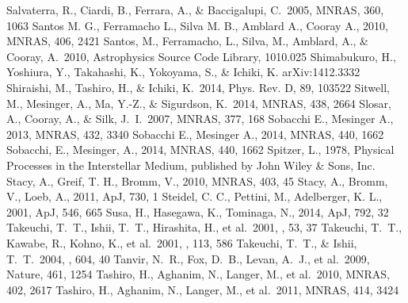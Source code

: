 \begin{thebibliography}{99}
\begin{multicols}{2}
{ Salvaterra, R., Ciardi, B., Ferrara, A., \& Baccigalupi, C.\ 2005, MNRAS, 360, 1063 
 Santos M. G., Ferramacho L., Silva M. B., Amblard A., Cooray A., 2010, MNRAS, 406, 2421
 Santos, M., Ferramacho, L., Silva, M., Amblard, A., \& Cooray, A.\ 2010, Astrophysics Source Code Library, 1010.025 
 Shimabukuro, H., Yoshiura, Y., Takahashi, K., Yokoyama, S., \& Ichiki, K. arXiv:1412.3332
 Shiraishi, M., Tashiro, H., \& Ichiki, K.\ 2014, Phys. Rev. D, 89, 103522 
 Sitwell, M., Mesinger, A., Ma, Y.-Z., \& Sigurdson, K.\ 2014, MNRAS, 438, 2664 
 Slosar, A., Cooray, A., \& Silk, J.~I.\ 2007, MNRAS, 377, 168 
 Sobacchi E., Mesinger A., 2013, MNRAS, 432, 3340
 Sobacchi E., Mesinger A., 2014, MNRAS, 440, 1662
 Sobacchi, E., Mesinger, A., 2014, MNRAS, 440, 1662
 Spitzer, L., 1978, Physical Processes in the Interstellar Medium, published by John Wiley \& Sons, Inc.  
 Stacy, A., Greif, T. H., Bromm, V., 2010, MNRAS, 403, 45
 Stacy, A., Bromm, V., Loeb, A., 2011, ApJ, 730, 1 
 Steidel, C. C., Pettini, M., Adelberger, K. L., 2001, ApJ, 546, 665
 Susa, H., Hasegawa, K., Tominaga, N., 2014, ApJ, 792, 32 
 Takeuchi, T.~T., 
Ishii, T.~T., Hirashita, H., et al.\ 2001, \pasj, 53, 37 
 Takeuchi, T.~T., 
Kawabe, R., Kohno, K., et al.\ 2001, \pasp, 113, 586 
 Takeuchi, T.~T., \& Ishii, T.~T.\ 2004, \apj, 604, 40 
 Tanvir, N.~R., Fox, D.~B., Levan, A.~J., et al.\ 2009, Nature, 461, 1254 
 Tashiro, H., Aghanim, N., Langer, M., et al.\ 2010, MNRAS, 402, 2617 
 Tashiro, H., Aghanim, N., Langer, M., et al.\ 2011, MNRAS, 414, 3424 
}
\end{multicols}
\end{thebibliography}
